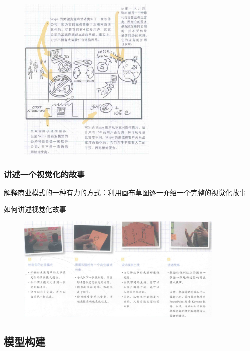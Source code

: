\begin{figure}[H]
	\centering
	\vspace{-0.5em}
	\includegraphics[width=0.6\textwidth]{img/为不同的需求采取不同的视觉化方式.png}
    \vspace{-0.5em}
\end{figure}

\subsubsection{讲述一个视觉化的故事}

解释商业模式的一种有力的方式：利用画布草图逐一介绍一个完整的视觉化故事

如何讲述视觉化故事
\begin{figure}[H]
	\centering
	\vspace{-0.5em}
	\includegraphics[width=0.9\textwidth]{img/如何讲述视觉化故事.png}
    \vspace{-0.5em}
\end{figure}

\subsection{模型构建}

